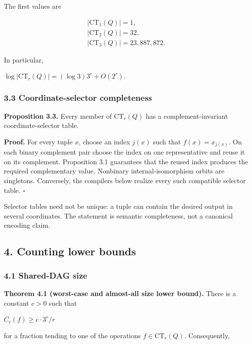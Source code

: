 \documentclass[
  11pt,
]{article}
\theoremstyle{definition}
\theoremstyle{remark}
\begin{document}
The first values are

\[
\begin{aligned}
|\mathrm{CT}_1(Q)| = 1, \\
|\mathrm{CT}_2(Q)| = 32, \\
|\mathrm{CT}_3(Q)| = 23,887,872.
\end{aligned}
\]

In particular,

\(\log |\mathrm{CT}_r(Q)| = (\log 3)3^r + O(2^r)\).

\hypertarget{coordinate-selector-completeness}{%
\subsubsection{3.3 Coordinate-selector
completeness}\label{coordinate-selector-completeness}}

\textbf{Proposition 3.3.} Every member of \(\mathrm{CT}_r(Q)\) has a
complement-invariant coordinate-selector table.

\textbf{Proof.} For every tuple \(x\), choose an index \(j(x)\) such
that \(f(x)=x_{j(x)}\). On each binary complement pair choose the index
on one representative and reuse it on its complement. Proposition 3.1
guarantees that the reused index produces the required complementary
value. Nonbinary internal-isomorphism orbits are singletons. Conversely,
the compilers below realize every such compatible selector table.
\(\square\)

Selector tables need not be unique: a tuple can contain the desired
output in several coordinates. The statement is semantic completeness,
not a canonical encoding claim.

\hypertarget{counting-lower-bounds}{%
\subsection{4. Counting lower bounds}\label{counting-lower-bounds}}

\hypertarget{shared-dag-size}{%
\subsubsection{4.1 Shared-DAG size}\label{shared-dag-size}}

\textbf{Theorem 4.1 (worst-case and almost-all size lower bound).} There
is a constant \(c>0\) such that

\(C_r(f) \ge  c\mathbin{\cdot}3^r/r\)

for a fraction tending to one of the operations
\(f \in \mathrm{CT}_r(Q)\). Consequently,
\end{document}
